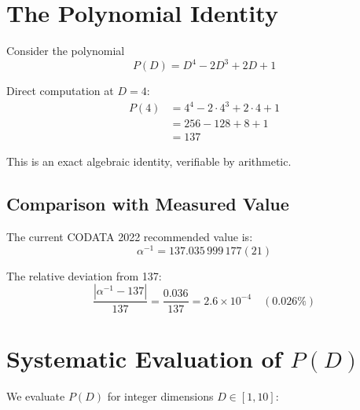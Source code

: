 \documentclass[11pt,a4paper]{article}
\begin{document}
\section{The Polynomial Identity}

Consider the polynomial
\begin{equation}
P(D) = D^4 - 2D^3 + 2D + 1
\end{equation}

Direct computation at $D = 4$:
\begin{align}
P(4) &= 4^4 - 2 \cdot 4^3 + 2 \cdot 4 + 1 \nonumber \\
     &= 256 - 128 + 8 + 1 \nonumber \\
     &= \boxed{137}
\end{align}

This is an exact algebraic identity, verifiable by arithmetic.

\subsection{Comparison with Measured Value}

The current CODATA 2022 recommended value is:
\begin{equation}
\alpha^{-1} = 137.035\,999\,177(21)
\end{equation}

The relative deviation from 137:
\begin{equation}
\frac{|\alpha^{-1} - 137|}{137} = \frac{0.036}{137} = 2.6 \times 10^{-4} \quad (0.026\%)
\end{equation}

\section{Systematic Evaluation of $P(D)$}

We evaluate $P(D)$ for integer dimensions $D \in [1, 10]$:
\end{document}

